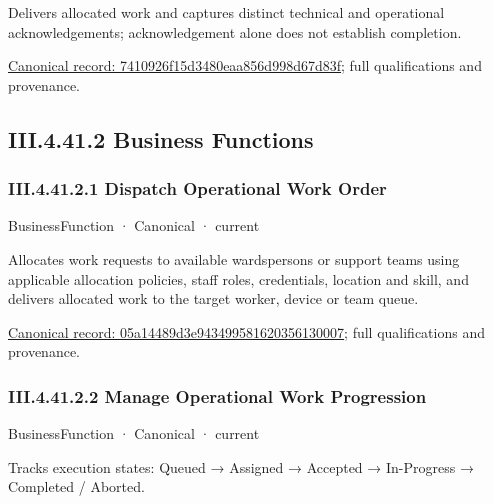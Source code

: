 Delivers allocated work and captures distinct technical and operational acknowledgements; acknowledgement alone does not establish completion.


{\footnotesize \href{../../../../continuum/business/business-service/7410926f15d3480eaa856d998d67d83f.md}{Canonical record: 7410926f15d3480eaa856d998d67d83f}; full qualifications and provenance.}\par
\subsection*{III.4.41.2 Business Functions}
\label{navigation:III.4.41.2}

\subsubsection*{III.4.41.2.1 Dispatch Operational Work Order}
\label{navigation:III.4.41.2.1}

\label{element:05a14489d3e943499581620356130007}
{\small BusinessFunction · Canonical · current}\par

Allocates work requests to available wardspersons or support teams using applicable allocation policies, staff roles, credentials, location and skill, and delivers allocated work to the target worker, device or team queue.


{\footnotesize \href{../../../../continuum/business/business-function/05a14489d3e943499581620356130007.md}{Canonical record: 05a14489d3e943499581620356130007}; full qualifications and provenance.}\par
\subsubsection*{III.4.41.2.2 Manage Operational Work Progression}
\label{navigation:III.4.41.2.2}

\label{element:ebc35951617a4f92863922b74dd1c1f4}
{\small BusinessFunction · Canonical · current}\par

Tracks execution states: Queued → Assigned → Accepted → In-Progress → Completed / Aborted.


